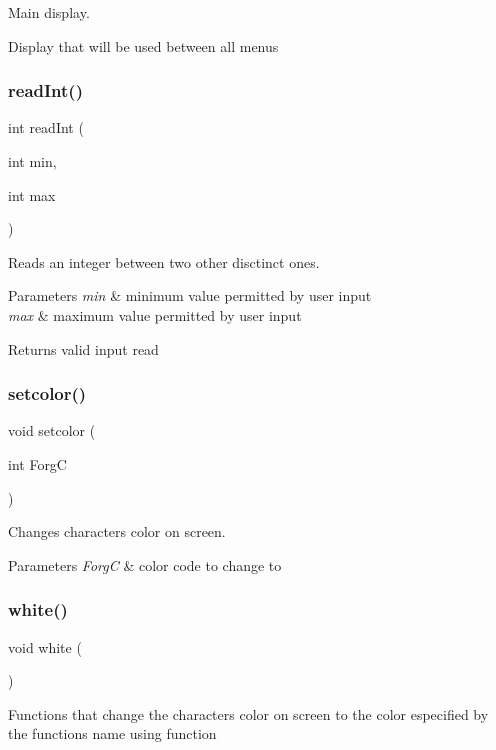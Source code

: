 Main display. 

Display that will be used between all menus \mbox{\label{group___utilities_ga8c6fba7e77f37f05bdf1369f9e89ca0d}} 
\subsubsection{\texorpdfstring{read\+Int()}{readInt()}}
{\footnotesize\ttfamily int read\+Int (\begin{DoxyParamCaption}\item[{int}]{min,  }\item[{int}]{max }\end{DoxyParamCaption})}



Reads an integer between two other disctinct ones. 


\begin{DoxyParams}{Parameters}
{\em min} & minimum value permitted by user input \\
\hline
{\em max} & maximum value permitted by user input\\
\hline
\end{DoxyParams}
\begin{DoxyReturn}{Returns}
valid input read 
\end{DoxyReturn}
\mbox{\label{group___utilities_gafacdcb839eb529bcd4fcf232bc342a8f}} 
\subsubsection{\texorpdfstring{setcolor()}{setcolor()}}
{\footnotesize\ttfamily void setcolor (\begin{DoxyParamCaption}\item[{int}]{ForgC }\end{DoxyParamCaption})}



Changes characters color on screen. 


\begin{DoxyParams}{Parameters}
{\em ForgC} & color code to change to \\
\hline
\end{DoxyParams}
\mbox{\label{group___utilities_gac0fd834412eb7d5311f137d919db6788}} 
\subsubsection{\texorpdfstring{white()}{white()}}
{\footnotesize\ttfamily void white (\begin{DoxyParamCaption}{ }\end{DoxyParamCaption})}

Functions that change the characters color on screen to the color especified by the functions name using  function 